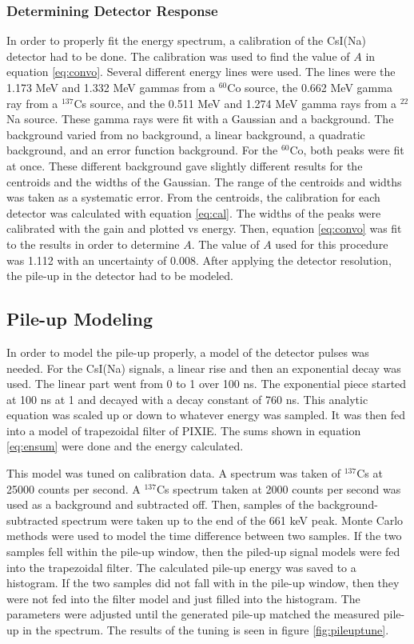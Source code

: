 \documentclass[../MaxHughesThesis.tex]{subfiles}
\begin{document}
\subsubsection{Determining Detector Response}
In order to properly fit the energy spectrum, a calibration of the CsI(Na) detector had to be done.
The calibration was used to find the value of $A$ in equation \ref{eq:convo}.
Several different energy lines were used.
The lines were the 1.173 MeV and 1.332 MeV gammas from a $^{60}$Co source, the 0.662 MeV gamma ray from a $^{137}$Cs source, and the 0.511 MeV and 1.274 MeV gamma rays from a $^{22}$Na source.
These gamma rays were fit with a Gaussian and a background.
The background varied from no background, a linear background, a quadratic background, and an error function background.
For the $^{60}$Co, both peaks were fit at once.
These different background gave slightly different results for the centroids and the widths of the Gaussian.
The range of the centroids and widths was taken as a systematic error.
From the centroids, the calibration for each detector was calculated with equation \ref{eq:cal}. 
The widths of the peaks were calibrated with the gain and plotted vs energy.
Then, equation \ref{eq:convo} was fit to the results in order to determine $A$.
The value of $A$ used for this procedure was 1.112 with an uncertainty of 0.008.
After applying the detector resolution, the pile-up in the detector had to be modeled.

\subsection{Pile-up Modeling}
In order to model the pile-up properly, a model of the detector pulses was needed. 
For the CsI(Na) signals, a linear rise and then an exponential decay was used.
The linear part went from 0 to 1 over 100 ns. 
The exponential piece started at 100 ns at 1 and decayed with a decay constant of 760 ns.
This analytic equation was scaled up or down to whatever energy was sampled.
It was then fed into a model of trapezoidal filter of PIXIE. 
The sums shown in equation \ref{eq:ensum} were done and the energy calculated.

This model was tuned on calibration data. 
A spectrum was taken of $^{137}$Cs at 25000 counts per second.
A  $^{137}$Cs spectrum taken at 2000 counts per second was used as a background and subtracted off.
Then, samples of the background-subtracted spectrum were taken up to the end of the 661 keV peak.
Monte Carlo methods were used to model the time difference between two samples.
If the two samples fell within the pile-up window, then the piled-up signal models were fed into the trapezoidal filter.
The calculated pile-up energy was saved to a histogram.
If the two samples did not fall with in the pile-up window, then they were not fed into the filter model and just filled into the histogram.
The parameters were adjusted until the generated pile-up matched the measured pile-up in the spectrum.
The results of the tuning is seen in figure \ref{fig:pileuptune}.
\end{document}
